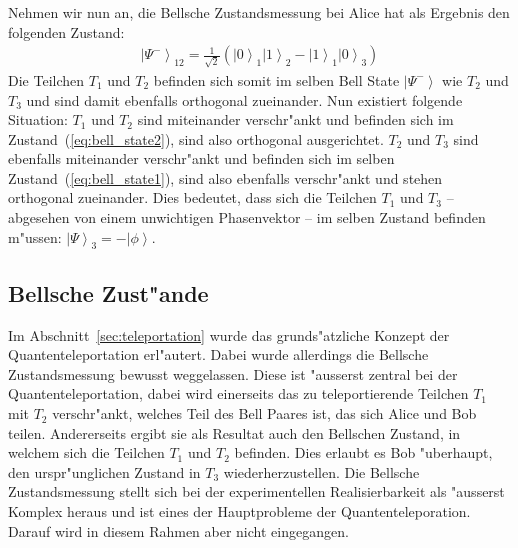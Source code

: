 \begin{refsection}
Nehmen wir nun an, die Bellsche Zustandsmessung bei Alice hat als Ergebnis den folgenden Zustand:
\begin{align}\label{eq:bell_state2}
\left|\Psi^{-}\right\rangle_{12} = \frac{1}{\sqrt{2}} ( \left|0\right\rangle_{1}\left|1\right\rangle_{2} - \left|1\right\rangle_{1}\left|0\right\rangle_{3} )
\end{align}
Die Teilchen $T_{1}$ und $T_{2}$ befinden sich somit im selben Bell State $\left| \Psi^{-} \right \rangle$ wie $T_{2}$ und $T_{3}$ und sind damit ebenfalls orthogonal zueinander. Nun existiert folgende Situation: $T_{1}$ und $T_{2}$ sind miteinander verschr"ankt und befinden sich im Zustand~(\ref{eq:bell_state2}), sind also orthogonal ausgerichtet. $T_{2}$ und $T_{3}$ sind ebenfalls miteinander verschr"ankt und befinden sich im selben Zustand~(\ref{eq:bell_state1}), sind also ebenfalls verschr"ankt und stehen orthogonal zueinander. Dies bedeutet, dass sich die Teilchen $T_{1}$ und $T_{3}$ -- abgesehen von einem unwichtigen Phasenvektor -- im selben Zustand befinden m"ussen: $\left| \Psi\right\rangle_{3} = -\left|\phi\right\rangle$.

\subsection{Bellsche Zust"ande}\label{sec:bell-states}
%

Im Abschnitt~\ref{sec:teleportation} wurde das grunds"atzliche Konzept der Quantenteleportation erl"autert. Dabei wurde allerdings die Bellsche Zustandsmessung bewusst weggelassen. Diese ist "ausserst zentral bei der Quantenteleportation, dabei wird einerseits das zu teleportierende Teilchen $T_{1}$ mit $T_{2}$ verschr"ankt, welches Teil des Bell Paares ist, das sich Alice und Bob teilen. Andererseits ergibt sie als Resultat auch den Bellschen Zustand, in welchem sich die Teilchen $T_{1}$ und $T_{2}$ befinden. Dies erlaubt es Bob "uberhaupt, den urspr"unglichen Zustand in $T_{3}$ wiederherzustellen. Die Bellsche Zustandsmessung stellt sich bei der experimentellen Realisierbarkeit als "ausserst Komplex heraus und ist eines der Hauptprobleme der Quantenteleporation. Darauf wird in diesem Rahmen aber nicht eingegangen.


\end{refsection}
